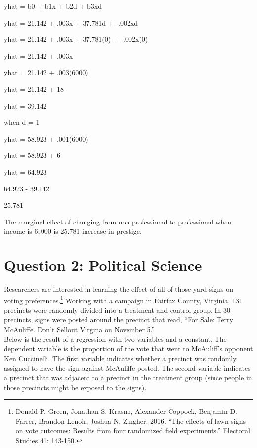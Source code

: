 \documentclass[12pt,letterpaper]{article}
\begin{document}
\begin{enumerate}
	 yhat = b0 + b1x + b2d + b3xd
	 
	yhat = 21.142 + .003x + 37.781d + -.002xd
	
	yhat = 21.142 + .003x + 37.781(0) +- .002x(0)
	
	yhat = 21.142 + .003x
	
	 yhat = 21.142 + .003(6000)
	 
	 yhat = 21.142 + 18
	 
	yhat = 39.142
	\vspace{1cm}
	
	
	 when d = 1
	 
	 yhat = 58.923 + .001(6000)
	 
	 yhat = 58.923 + 6
	 
	yhat = 64.923
		\vspace{1cm}
	
	 64.923 - 39.142
	 
	25.781
		\vspace{1cm}
		
	The marginal effect of changing from non-professional to professional when
	 income is $6,000$ is 25.781 increase in prestige. 
	
	
	
\end{enumerate}

\newpage

\section*{Question 2: Political Science}
\vspace{.25cm}
\noindent 	Researchers are interested in learning the effect of all of those yard signs on voting preferences.\footnote{Donald P. Green, Jonathan	S. Krasno, Alexander Coppock, Benjamin D. Farrer,	Brandon Lenoir, Joshua N. Zingher. 2016. ``The effects of lawn signs on vote outcomes: Results from four randomized field experiments.'' Electoral Studies 41: 143-150. } Working with a campaign in Fairfax County, Virginia, 131 precincts were randomly divided into a treatment and control group. In 30 precincts, signs were posted around the precinct that read, ``For Sale: Terry McAuliffe. Don't Sellout Virgina on November 5.'' \\

Below is the result of a regression with two variables and a constant.  The dependent variable is the proportion of the vote that went to McAuliff's opponent Ken Cuccinelli. The first variable indicates whether a precinct was randomly assigned to have the sign against McAuliffe posted. The second variable indicates
a precinct that was adjacent to a precinct in the treatment group (since people in those precincts might be exposed to the signs).  \\
\end{document}
